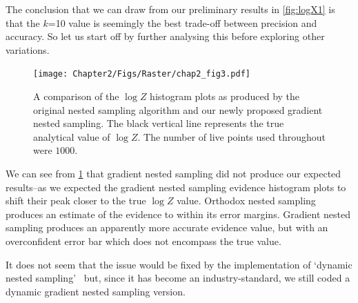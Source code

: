 The conclusion that we can draw from our preliminary results in \cref{fig:logX1} is that the $k$=10 value is seemingly the best trade-off between precision and accuracy. So let us start off by further analysing this before exploring other variations.


\begin{figure} 
\centering    
\texttt{[image: Chapter2/Figs/Raster/chap2\_fig3.pdf]}
\caption{ A comparison of the $\log Z$ histogram plots as produced by the original nested sampling algorithm and our newly proposed gradient nested sampling. The black vertical line represents the true analytical value of $\log Z$. The number of live points used throughout were $1000$.}
\label{fig:loll}
\end{figure}

We can see from \cref{fig:loll} that gradient nested sampling did not produce our expected results--as we expected the gradient nested sampling evidence histogram plots to shift their peak closer to the true $\log Z$ value. Orthodox nested sampling produces an estimate of the evidence to within its error margins. Gradient nested sampling produces an apparently more accurate evidence value, but with an overconfident error bar which does not encompass the true value.

It does not seem that the issue would be fixed by the implementation of `dynamic nested sampling'~\cite{Higson_2018} but, since it has become an industry-standard, we still coded a dynamic gradient nested sampling version. 

